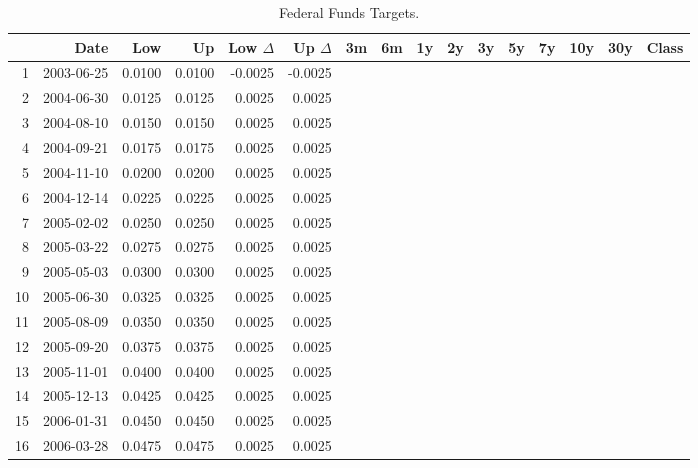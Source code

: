 

\begin{sidewaystable}[htbp]
	\centering
	\small
	\caption{Federal Funds Targets.} 
	\label{tab:OMOs}
	\begin{tabular}{rrrrrrrrrrrrrrrr}
		\toprule
		& Date & Low & Up & Low $\Delta$ & Up $\Delta$ & 3m & 6m & 1y & 2y & 3y & 5y & 7y & 10y & 30y & Class \\ 
		\midrule
		1 & 2003-06-25 & 0.0100 & 0.0100 & -0.0025 & -0.0025 &  &  &  &  &  &  &  &  &  &  \\ 
		2 & 2004-06-30 & 0.0125 & 0.0125 & 0.0025 & 0.0025 &  &  &  &  &  &  &  &  &  &  \\ 
		3 & 2004-08-10 & 0.0150 & 0.0150 & 0.0025 & 0.0025 &  &  &  &  &  &  &  &  &  &  \\ 
		4 & 2004-09-21 & 0.0175 & 0.0175 & 0.0025 & 0.0025 &  &  &  &  &  &  &  &  &  &  \\ 
		5 & 2004-11-10 & 0.0200 & 0.0200 & 0.0025 & 0.0025 &  &  &  &  &  &  &  &  &  &  \\ 
		6 & 2004-12-14 & 0.0225 & 0.0225 & 0.0025 & 0.0025 &  &  &  &  &  &  &  &  &  &  \\ 
		7 & 2005-02-02 & 0.0250 & 0.0250 & 0.0025 & 0.0025 &  &  &  &  &  &  &  &  &  &  \\ 
		8 & 2005-03-22 & 0.0275 & 0.0275 & 0.0025 & 0.0025 &  &  &  &  &  &  &  &  &  &  \\ 
		9 & 2005-05-03 & 0.0300 & 0.0300 & 0.0025 & 0.0025 &  &  &  &  &  &  &  &  &  &  \\ 
		10 & 2005-06-30 & 0.0325 & 0.0325 & 0.0025 & 0.0025 &  &  &  &  &  &  &  &  &  &  \\ 
		11 & 2005-08-09 & 0.0350 & 0.0350 & 0.0025 & 0.0025 &  &  &  &  &  &  &  &  &  &  \\ 
		12 & 2005-09-20 & 0.0375 & 0.0375 & 0.0025 & 0.0025 &  &  &  &  &  &  &  &  &  &  \\ 
		13 & 2005-11-01 & 0.0400 & 0.0400 & 0.0025 & 0.0025 &  &  &  &  &  &  &  &  &  &  \\ 
		14 & 2005-12-13 & 0.0425 & 0.0425 & 0.0025 & 0.0025 &  &  &  &  &  &  &  &  &  &  \\ 
		15 & 2006-01-31 & 0.0450 & 0.0450 & 0.0025 & 0.0025 &  &  &  &  &  &  &  &  &  &  \\ 
		16 & 2006-03-28 & 0.0475 & 0.0475 & 0.0025 & 0.0025 &  &  &  &  &  &  &  &  &  &  \\ 

\end{tabular}
\end{sidewaystable}

